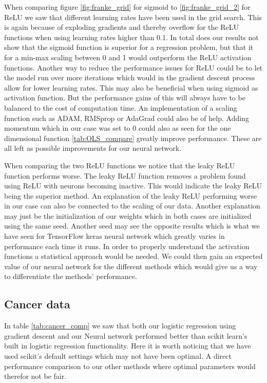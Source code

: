 \documentclass[11pt]{article}
\begin{document}
When comparing figure \ref{fig:franke_grid} for sigmoid to \ref{fig:franke_grid_2} for ReLU we saw that different learning rates have been used in the grid search. This is again because of exploding gradients and thereby overflow for the ReLU functions when using learning rates higher than 0.1. In total does our results not show that the sigmoid function is superior for a regression problem, but that it for a min-max scaling between 0 and 1 would outperform the ReLU activation functions. Another way to reduce the performance issues for ReLU could be to let the model run over more iterations which would in the gradient descent process allow for lower learning rates. This may also be beneficial when using sigmoid as activation function. But the performance gains of this will always have to be balanced to the cost of computation time.  An implementation of a scaling function such as ADAM, RMSprop or AdaGrad could also be of help. Adding momentum which in our case was set to 0 could also as seen for the one dimensional function \ref{tab:OLS_compare} greatly improve performance. These are all left as possible improvements for our neural network.

When comparing the two ReLU functions we notice that the leaky ReLU function performs worse. The leaky ReLU function removes a problem found using ReLU with neurons becoming inactive. This would indicate the leaky ReLU being the superior method. An explanation of the leaky ReLU performing worse in our case can also be connected to the scaling of our data. Another explanation may just be the initialization of our weights which in both cases are initialized using the same seed. Another seed may see the opposite results which is what we have seen for TensorFlow keras neural network which greatly varies in performance each time it runs. In order to properly understand the activation functions a statistical approach would be needed. We could then gain an expected value of our neural network for the different methods which would give us a way to differentiate the methods' performance.

\subsection{Cancer data}
In table \ref{tab:cancer_comp} we saw that both our logistic regression using gradient descent and our Neural network performed better than scikit learn's built in logistic regression functionality. Here it is worth noticing that we have used scikit's default settings which may not have been optimal. A direct performance comparison to our other methods where optimal parameters would therefor not be fair.
\end{document}
